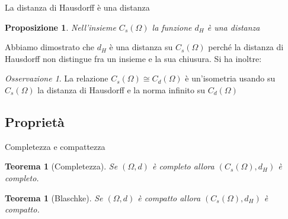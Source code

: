 \documentclass{beamer}
\newcounter{counter1}
\theoremstyle{plain}
\newtheorem{myteo}[counter1]{Teorema}
\newtheorem{mypro}[counter1]{Proposizione}
\theoremstyle{definition}
\theoremstyle{remark}
\newtheorem{myoss}[counter1]{Osservazione}
\newcommand{\obar}[1]{\overline{#1}}
\newcommand{\set}[1]{\left\{#1\right\}}
\newcommand{\pa}[1]{\left(#1\right)}
\newcommand{\abs}[1]{\left|#1\right|}
\newcommand{\norm}[1]{\left\|#1\right\|}
\begin{document}
\begin{frame}{La distanza di Hausdorff è una distanza}
  \begin{mypro}
    Nell'insieme $C_s(\Omega)$ la funzione $d_H$ è una distanza
  \end{mypro}

    

  \vfill
  Abbiamo dimostrato che $d_H$ è una distanza su $C_s(\Omega)$ perché
  la distanza di Hausdorff non distingue fra un insieme e la sua
  chiusura.
  \vfill
  Si ha inoltre:
  \begin{myoss}
    La relazione $C_s(\Omega) \cong C_d(\Omega)$ è un'isometria usando
    su $C_s(\Omega)$ la distanza di Hausdorff e la norma infinito su
    $C_d(\Omega)$
  \end{myoss}
\end{frame}

\subsection{Proprietà}

\begin{frame}{Completezza e compattezza}
  \begin{myteo}[Completezza]%
    Se $(\Omega,d)$ è completo allora $\pa{C_s(\Omega),d_H}$ è completo.
  \end{myteo}
  \vfill

  \begin{myteo}[Blaschke]%
    Se $(\Omega,d)$ è compatto allora $\pa{C_s(\Omega),d_H}$ è compatto.
  \end{myteo}
    
\end{frame}
\end{document}
